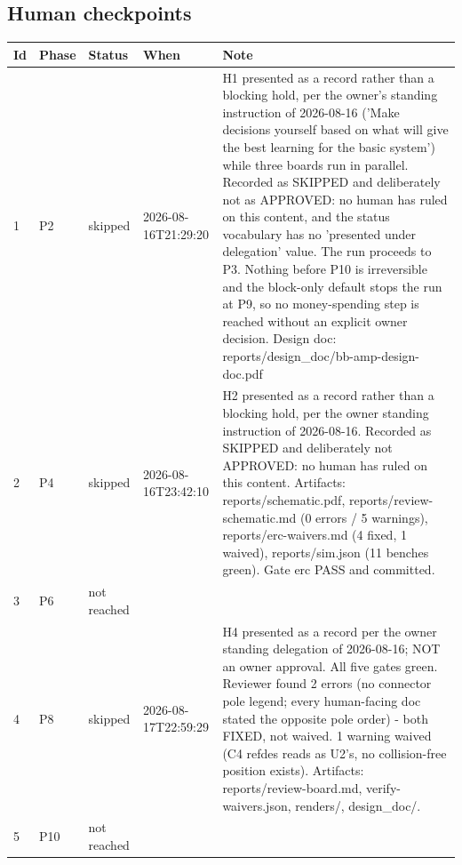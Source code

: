 \documentclass[11pt,a4paper]{article}
\begin{document}
\subsection*{Human checkpoints}
{\small
\begin{longtable}{lllp{2.6cm}p{6.4cm}}
\toprule
\textbf{Id} & \textbf{Phase} & \textbf{Status} & \textbf{When} & \textbf{Note} \\
\midrule
\endhead
1 & P2 & skipped & 2026-08-16T21:29:20 & H1 presented as a record rather than a blocking hold, per the owner's standing instruction of 2026-08-16 ('Make decisions yourself based on what will give the best learning for the basic system') while three boards run in parallel. Recorded as SKIPPED and deliberately not as APPROVED: no human has ruled on this content, and the status vocabulary has no 'presented under delegation' value. The run proceeds to P3. Nothing before P10 is irreversible and the block-only default stops the run at P9, so no money-spending step is reached without an explicit owner decision. Design doc: reports/design\_doc/bb-amp-design-doc.pdf \\
2 & P4 & skipped & 2026-08-16T23:42:10 & H2 presented as a record rather than a blocking hold, per the owner standing instruction of 2026-08-16. Recorded as SKIPPED and deliberately not APPROVED: no human has ruled on this content. Artifacts: reports/schematic.pdf, reports/review-schematic.md (0 errors / 5 warnings), reports/erc-waivers.md (4 fixed, 1 waived), reports/sim.json (11 benches green). Gate erc PASS and committed. \\
3 & P6 & not reached &  &  \\
4 & P8 & skipped & 2026-08-17T22:59:29 & H4 presented as a record per the owner standing delegation of 2026-08-16; NOT an owner approval. All five gates green. Reviewer found 2 errors (no connector pole legend; every human-facing doc stated the opposite pole order) - both FIXED, not waived. 1 warning waived (C4 refdes reads as U2's, no collision-free position exists). Artifacts: reports/review-board.md, verify-waivers.json, renders/, design\_doc/. \\
5 & P10 & not reached &  &  \\
\bottomrule
\end{longtable}
}
\end{document}
